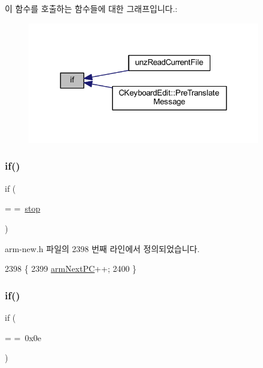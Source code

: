 이 함수를 호출하는 함수들에 대한 그래프입니다.\+:
\nopagebreak
\begin{figure}[H]
\begin{center}
\leavevmode
\includegraphics[width=288pt]{arm-new_8h_a93120066fd6daa54150af823953378d1_icgraph}
\end{center}
\end{figure}
\mbox{\label{arm-new_8h_aca0d2021022767d4ac93ab2232d4516e}} 
\subsubsection{\texorpdfstring{if()}{if()}\hspace{0.1cm}{\footnotesize\ttfamily [2/3]}}
{\footnotesize\ttfamily if (\begin{DoxyParamCaption}\item[{\mbox{\hyperlink{thumb_8h_a7e8bf67a6667274a53fc092b97961ca4}{arm\+Next\+PC}}}]{ = {\ttfamily =~\mbox{\hyperlink{_globals_8h_aab84c44d931c6e2d40f35f5831bfed51}{stop}}} }\end{DoxyParamCaption})}



arm-\/new.\+h 파일의 2398 번째 라인에서 정의되었습니다.


\begin{DoxyCode}
2398                         \{
2399     \mbox{\hyperlink{arm-new_8h_a7e8bf67a6667274a53fc092b97961ca4}{armNextPC}}++;
2400   \}
\end{DoxyCode}
\mbox{\label{arm-new_8h_a24f39fae4e25f77789f6de1207e383e7}} 
\subsubsection{\texorpdfstring{if()}{if()}\hspace{0.1cm}{\footnotesize\ttfamily [3/3]}}
{\footnotesize\ttfamily if (\begin{DoxyParamCaption}\item[{\mbox{\hyperlink{arm-new_8h_a33a0b4d4eea3603435124a4255231922}{cond}}}]{ = {\ttfamily =~0x0e} }\end{DoxyParamCaption})}



